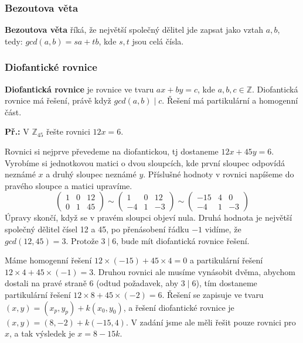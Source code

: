 \subsubsection{Bezoutova věta}
\textbf{Bezoutova věta} říká, že největší společný dělitel jde zapsat jako vztah
$a,b$, tedy: $gcd(a, b) = sa + tb$, kde $s,t$ jsou celá čísla.

\subsubsection{Diofantické rovnice}
\textbf{Diofantická rovnice} je rovnice ve tvaru $ax + by = c$, kde $a,b,c \in
\mathbb{Z}$. Diofantická rovnice má řešení, právě když $gcd(a,b) \mid c$. Řešení
má partikulární a homogenní část.

\begin{exercise}
    
\textbf{Př.:} V $\mathbb{Z}_{45}$ řešte rovnici $12x = 6$.

Rovnici si nejprve převedeme na diofantickou, tj dostaneme $12x + 45y = 6$.
Vyrobíme si jednotkovou matici o dvou sloupcích, kde první sloupec odpovídá
neznámé $x$ a druhý sloupec neznámé $y$. Příslušné hodnoty v rovnici napíšeme do
pravého sloupce a matici upravíme.
\[ \left( \begin{array}{cc|c}
1 & 0 & 12\\
0 & 1 & 45 \end{array} \right)
%
\sim
%
\left( \begin{array}{cc|c}
1 & 0 & 12\\
-4 & 1 & -3 \end{array} \right)
%
\sim
%
\left( \begin{array}{cc|c}
-15 & 4 & 0\\
-4 & 1 & -3 \end{array} \right) \] Úpravy skončí, když se v pravém sloupci
objeví nula. Druhá hodnota je největší společný dělitel čísel 12 a 45, po
přenásobení řádku $-1$ vidíme, že $gcd(12,45)=3$. Protože $3 \mid 6$, bude mít
diofantická rovnice řešení.

Máme homogenní řešení $12\times(-15) + 45\times 4 = 0$ a partikulární řešení
$12\times4 + 45\times(-1) = 3$. Druhou rovnici ale musíme vynásobit dvěma,
abychom dostali na pravé straně 6 (odtud požadavek, aby $3\mid6$), tím dostaneme
partikulární řešení $12\times8 + 45\times(-2) = 6$. Řešení se zapisuje ve tvaru
$(x,y) = (x_p,y_p) + k(x_0,y_0)$, a řešení diofantické rovnice je $(x,y) = (8,
-2) + k(-15,4)$. V zadání jsme ale měli řešit pouze rovnici pro $x$, a tak
výsledek je $x = 8 - 15k$.
\end{exercise}

